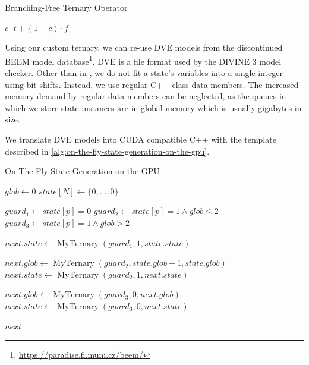 \documentclass[
fancyheadings, %
%
%
]{stsreprt}
\DeclareMathOperator{\sSuccessor}{state\_successor}
\begin{document}
\begin{algorithm}
    \caption{Branching-Free Ternary Operator}
    \label{alg:branching-free-ternary-operator}
    \begin{algorithmic}
        \State \Return $c \cdot t + (1 - c) \cdot f$
        \EndFunction
    \end{algorithmic}
\end{algorithm}

Using our custom ternary, we can re-use DVE models from the discontinued BEEM model database\footnote{\url{https://paradise.fi.muni.cz/beem/}}.
DVE is a file format used by the DIVINE 3 model checker.
Other than in \cite{Bartocci2014.GPGPU-Parallel-SPIN}, we do not fit a state's variables into a single integer using bit shifts.
Instead, we use regular C++ class data members.
The increased memory demand by regular data members can be neglected, as the queues in which we store state instances are in global memory which is usually gigabytes in size.

We translate DVE models into CUDA compatible C++ with the template described in \cref{alg:on-the-fly-state-generation-on-the-gpu}.

\begin{algorithm}
    \caption{On-The-Fly State Generation on the GPU}
    \label{alg:on-the-fly-state-generation-on-the-gpu}
    \begin{algorithmic}
        \State $glob \gets 0$
        \State $state[N] \gets \{0, \dots, 0\}$

        \Function{$\sSuccessor$}{p, ndc, state}
        \State $guard_1 \gets state[p] = 0$
        \State $guard_2 \gets state[p] = 1 \land glob \leq 2$
        \State $guard_3 \gets state[p] = 1 \land glob > 2$

        \State $next.state \gets \operatorname{MyTernary}(guard_1, 1, state.state)$

        \State $next.glob \gets \operatorname{MyTernary}(guard_2, state.glob + 1, state.glob)$
        \State $next.state \gets \operatorname{MyTernary}(guard_2, 1, next.state)$

        \State $next.glob \gets \operatorname{MyTernary}(guard_3, 0, next.glob)$
        \State $next.state \gets \operatorname{MyTernary}(guard_3, 0, next.state)$

        \State \Return $next$
        \EndFunction
    \end{algorithmic}
\end{algorithm}
\end{document}
